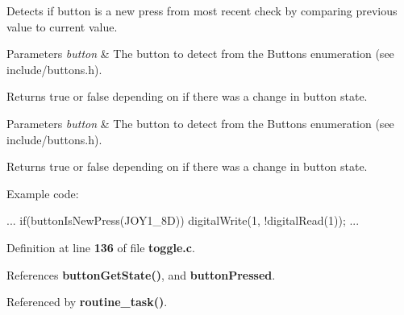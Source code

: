 Detects if button is a new press from most recent check by comparing previous value to current value. 


\begin{DoxyParams}{Parameters}
{\em button} & The button to detect from the Buttons enumeration (see include/buttons.\+h).\\
\hline
\end{DoxyParams}
\begin{DoxyReturn}{Returns}
true or false depending on if there was a change in button state.
\end{DoxyReturn}

\begin{DoxyParams}{Parameters}
{\em button} & The button to detect from the Buttons enumeration (see include/buttons.\+h).\\
\hline
\end{DoxyParams}
\begin{DoxyReturn}{Returns}
true or false depending on if there was a change in button state.
\end{DoxyReturn}
Example code\+: 
\begin{DoxyCode}
...
if(buttonIsNewPress(JOY1_8D))
    digitalWrite(1, !digitalRead(1));
...
\end{DoxyCode}
 

Definition at line \textbf{ 136} of file \textbf{ toggle.\+c}.



References \textbf{ button\+Get\+State()}, and \textbf{ button\+Pressed}.



Referenced by \textbf{ routine\+\_\+task()}.


